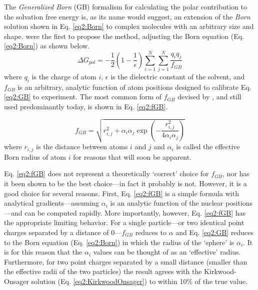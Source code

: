 The \emph{Generalized Born} (GB) formalism for calculating the polar
contribution to the solvation free energy is, as its name would suggest, an
extension of the \emph{Born} solution shown in Eq. \ref{eq2:Born} to complex
molecules with an arbitrary size and shape.
\cite{Still_JAmChemSoc_1990_v112_p6127, Qiu_JPhysChemA_1997_v101_p3005,
Onufriev_JPhysChemB_2000_v104_p3712, Bashford_AnnuRevPhysChem_2000_v51_p129,
Onufriev_JComputChem_2002_v23_p1297}
\citeauthor{Still_JAmChemSoc_1990_v112_p6127} were the first to propose the
method, adjusting the Born equation (Eq. \ref{eq2:Born}) as shown below.
\cite{Still_JAmChemSoc_1990_v112_p6127}
\begin{equation}
   \Delta G _ {pol} = -\frac 1 2 \left( 1 - \frac 1 {\epsilon} \right)
      \sum_{i=1}^N \sum_{j=1}^N \frac {q_i q_j} {f_{GB}}
   \label{eq2:GB}
\end{equation}
where $q_i$ is the charge of atom $i$, $\epsilon$ is the dielectric constant of
the solvent, and $f_{GB}$ is an arbitrary, analytic function of atom positions
designed to calibrate Eq. \ref{eq2:GB} to experiment. The most common form of
$f_{GB}$ devised by \citeauthor{Still_JAmChemSoc_1990_v112_p6127}, and still
used predominantly today, is shown in Eq. \ref{eq2:fGB}.

\begin{equation}
   f_{GB} = \sqrt{r_{i,j}^2 + \alpha_i \alpha_j \exp \left( - \frac {r_{i,j}^2}
            {4 \alpha_i \alpha_j} \right)}
   \label{eq2:fGB}
\end{equation}
where $r_{i,j}$ is the distance between atoms $i$ and $j$ and $\alpha_i$ is
called the effective Born radius of atom $i$ for reasons that will soon be
apparent.

Eq. \ref{eq2:fGB} does not represent a theoretically `correct' choice for
$f_{GB}$, nor has it been shown to be the best choice---in fact it probably is
not. \cite{Onufriev_JChemPhys_2011_v134_p164104} However, it is a good choice
for several reasons. First, Eq. \ref{eq2:fGB} is a simple formula with
analytical gradients---assuming $\alpha_i$ is an analytic function of the
nuclear positions---and can be computed rapidly. More importantly, however, Eq.
\ref{eq2:fGB} has the appropriate limiting behavior.
\cite{Still_JAmChemSoc_1990_v112_p6127} For a single particle---or two identical
point charges separated by a distance of 0---$f_{GB}$ reduces to $\alpha$ and
Eq. \ref{eq2:GB} reduces to the Born equation (Eq. \ref{eq2:Born}) in which the
radius of the `sphere' is $\alpha_i$. It is for this reason that the $\alpha_i$
values can be thought of as an `effective' radius. Furthermore, for two point
charges separated by a small distance (\ie smaller than the effective radii of
the two particles) the result agrees with the Kirkwood-Onsager solution (Eq.
\ref{eq2:KirkwoodOnsager}) to within 10\% of the true value.
\cite{Still_JAmChemSoc_1990_v112_p6127}

